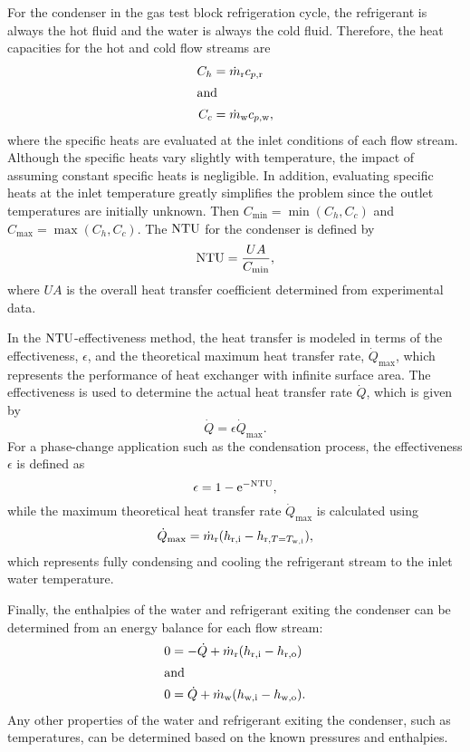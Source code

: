 For the condenser in the gas test block refrigeration cycle,
the refrigerant is always the hot fluid and the water is always the cold fluid.
Therefore, the heat capacities for the hot and cold flow streams are
\begin{align}
  C_h &= \dot{m}_{\text{r}} c_{p,\text{r}} \\
  \shortintertext{and}
  C_c &= \dot{m}_{\text{w}} c_{p,\text{w}},
\end{align}
where the specific heats are evaluated at the inlet conditions of each flow stream.
Although the specific heats vary slightly with temperature, the impact of assuming
constant specific heats is negligible.
In addition, evaluating specific heats at the inlet temperature greatly 
simplifies the problem since the outlet temperatures are initially unknown.
Then $C_{\min} = \min{(C_h,C_c)}$ and $C_{\max} = \max{(C_h,C_c)}$. The $\mathrm{NTU}$
for the condenser is defined by
\begin{equation}
  \mathrm{NTU} = \frac{UA}{C_{\min}},
\end{equation}
where $UA$ is the overall heat transfer coefficient determined from experimental data.

In the $\mathrm{NTU}$-effectiveness method, the heat transfer is modeled in terms of
the effectiveness, $\epsilon$, and the theoretical maximum heat transfer rate,
$\dot{Q}_{\max}$,
which represents the performance of heat exchanger with infinite surface area.
The effectiveness is used to determine the actual heat transfer rate
$\dot{Q}$, which is given by
\begin{equation}
  \dot{Q} = \epsilon \dot{Q}_{\max}.
\end{equation}
For a phase-change application such as the condensation process, 
the effectiveness $\epsilon$ is defined as
\begin{equation}
  \epsilon = 1 - \mathrm{e}^{-\mathrm{NTU}},
\end{equation}
while the maximum theoretical heat transfer rate $\dot{Q}_{\max}$ is 
calculated using
\begin{equation}
  \dot{Q}_{\max} = \dot{m}_{\text{r}} (h_{\text{r},\text{i}} - h_{\text{r},T=T_{\text{w},\text{i}}}),
\end{equation}
which represents fully condensing and cooling the refrigerant stream to the
inlet water temperature. 

Finally, the enthalpies of the water and refrigerant exiting the condenser
can be determined from an energy balance for each flow stream:
\begin{align}
  0 &= -\dot{Q} + \dot{m}_{\text{r}}(h_{\text{r},\text{i}} - h_{\text{r},\text{o}}) \\
  \shortintertext{and}
  0 &= \dot{Q} + \dot{m}_{\text{w}}(h_{\text{w},\text{i}} - h_{\text{w},\text{o}}).
\end{align}
Any other properties of the water and refrigerant exiting the condenser,
such as temperatures, can be determined based on the known pressures and enthalpies.


